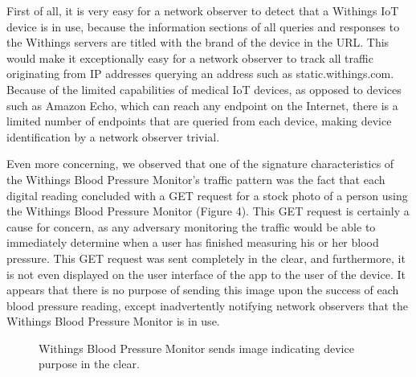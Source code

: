 First of all, it is very easy for a network observer to detect that a Withings IoT device is in use, because the information sections of all queries and responses to the Withings servers are titled with the brand of the device in the URL. This would make it exceptionally easy for a network observer to track all traffic originating from IP addresses querying an address such as static.withings.com. Because of the limited capabilities of medical IoT devices, as opposed to devices such as Amazon Echo, which can reach any endpoint on the Internet, there is a limited number of endpoints that are queried from each device, making device identification by a network observer trivial.

Even more concerning, we observed that one of the signature characteristics of the Withings Blood Pressure Monitor's traffic pattern was the fact that each digital reading concluded with a GET request for a stock photo of a person using the Withings Blood Pressure Monitor (Figure 4). This GET request is certainly a cause for concern, as any adversary monitoring the traffic would be able to immediately determine when a user has finished measuring his or her blood pressure. This GET request was sent completely in the clear, and furthermore, it is not even displayed on the user interface of the app to the user of the device. It appears that there is no purpose of sending this image upon the success of each blood pressure reading, except inadvertently notifying network observers that the Withings Blood Pressure Monitor is in use. 

\begin{figure}
  \centering
     \caption{Withings Blood Pressure Monitor sends image indicating device purpose in the clear.}
     \label{fig:bp-image}
\end{figure}


